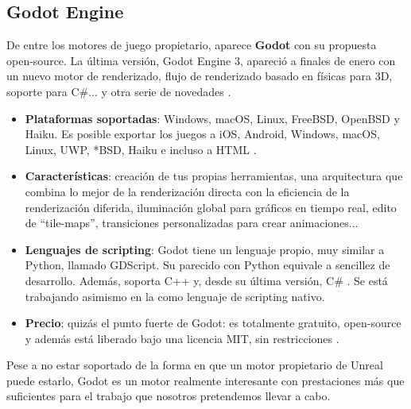 \subsection{Godot Engine}
De entre los motores de juego propietario, aparece \textbf{Godot} con su propuesta open-source. La última versión, Godot Engine 3, apareció a finales de enero con un nuevo motor de renderizado, flujo de renderizado basado en físicas para 3D, soporte para C\#... y otra serie de novedades \cite{newgodot}.
\begin{itemize}
\item \textbf{Plataformas soportadas}: Windows, macOS, Linux, FreeBSD, OpenBSD y Haiku. Es posible exportar los juegos a iOS, Android, Windows, macOS, Linux, UWP, *BSD, Haiku e incluso a HTML \cite{godotfeatures}.
\item \textbf{Características}: creación de tus propias herramientas, una arquitectura que combina lo mejor de la renderización directa con la eficiencia de la renderización diferida, iluminación global para gráficos en tiempo real, edito de ``tile-maps'', transiciones personalizadas para crear animaciones...\cite{godotfeatures}
\item \textbf{Lenguajes de scripting}: Godot tiene un lenguaje propio, muy similar a Python, llamado GDScript. Su parecido con Python equivale a sencillez de desarrollo. Además, soporta C++ y, desde su última versión, C\# \cite{godotfeatures}. Se está trabajando asimismo en la  como lenguaje de scripting nativo.
\item \textbf{Precio}: quizás el punto fuerte de Godot: es totalmente gratuito, open-source y además está liberado bajo una licencia MIT, sin restricciones \cite{godotfree}.
\end{itemize}

Pese a no estar soportado de la forma en que un motor propietario de Unreal puede estarlo, Godot es un motor realmente interesante con prestaciones más que suficientes para el trabajo que nosotros pretendemos llevar a cabo.

